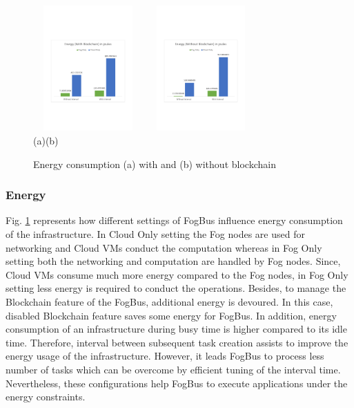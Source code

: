 \documentclass[final,5p,times,twocolumn]{elsarticle}
\begin{document}
\begin{figure}[h]
	\begin{center}
	\centering
		\includegraphics[width=42mm, height=48mm]{Energy1}
		\hspace{5pt}
		\includegraphics[width=42mm, height=48mm]{Energy2}\\
        \footnotesize{(a)\hspace{120pt}(b)}\\		 
   	\caption{Energy consumption (a) with and (b) without blockchain} \label{fig:energy}
	\end{center}
\end{figure}
%
\subsubsection{Energy}
%
Fig. \ref{fig:energy} represents how different settings of FogBus influence energy consumption of the infrastructure. In Cloud Only setting the Fog nodes are used for networking and Cloud VMs conduct the computation whereas in Fog Only setting both the networking and computation are handled by Fog nodes. Since, Cloud VMs consume much more energy compared to the Fog nodes, in Fog Only setting less energy is required to conduct the operations. Besides, to manage the Blockchain feature of the FogBus, additional energy is devoured. In this case, disabled Blockchain feature saves some energy for FogBus. In addition, energy consumption of an infrastructure during busy time is higher compared to its idle time. Therefore, interval between subsequent task creation assists to improve the energy usage of the infrastructure. However, it leads FogBus to process less number of tasks which can be overcome by efficient tuning of the interval time. Nevertheless, these configurations help FogBus to execute applications under the energy constraints.
%
\end{document}
